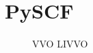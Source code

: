 \section{PySCF}
\begin{figure}[t]
    \centering
    \caption{VVO LIVVO}
    \label{img:vvlivvo}
\end{figure}
